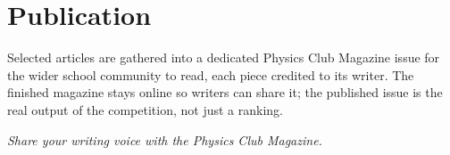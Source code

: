 \documentclass[12pt]{article}
\begin{document}
\section{Publication}
Selected articles are gathered into a dedicated Physics Club Magazine issue
for the wider school community to read, each piece credited to its writer. The
finished magazine stays online so writers can share it; the published issue is
the real output of the competition, not just a ranking.

\begin{center}
\large\itshape\color{bodytext} Share your writing voice with the Physics Club Magazine.
\end{center}
\end{document}
